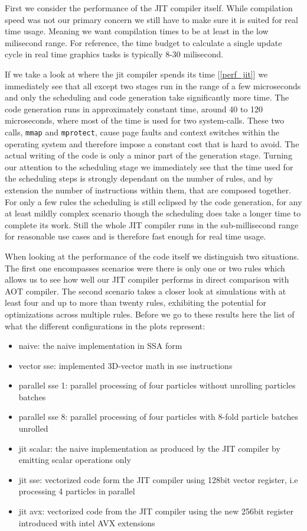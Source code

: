 First we consider the performance of the JIT compiler itself. While compilation speed was not our primary concern we still have to make sure it is suited for real time usage. Meaning we want compilation times to be at least in the low milisecond range. For reference, the time budget to calculate a single update cycle in real time graphics tasks is typically 8-30 milisecond.

If we take a look at where the jit compiler spends its time [\ref{perf_jit}] we immediately see that all except two stages run in the range of a few microseconds and only the scheduling and code generation take significantly more time. The code generation runs in approximately constant time, around 40 to 120 microseconds, where most of the time is used for two system-calls. These two calls, \texttt{mmap} and \texttt{mprotect}, cause page faults and context switches within the operating system and therefore impose a constant cost that is hard to avoid. The actual writing of the code is only a minor part of the generation stage. Turning our attention to the scheduling stage we immediately see that the time used for the scheduling steps is strongly dependant on the number of rules, and by extension the number of instructions within them, that are composed together. For only a few rules the scheduling is still eclipsed by the code generation, for any at least mildly complex scenario though the scheduling does take a longer time to complete its work. Still the whole JIT compiler runs in the sub-millisecond range for reasonable use cases and is therefore fast enough for real time usage.


When looking at the performance of the code itself we distinguish two situations. The first one encompasses scenarios were there is only one or two rules which allows us to see how well our JIT compiler performs in direct comparison with AOT compiler. The second scenario takes a closer look at simulations with at least four and up to more than twenty rules, exhibiting the potential for optimizations across multiple rules. Before we go to these results here the list of what the different configurations in the plots represent:
\begin{itemize}
\item naive: the naive implementation in SSA form
\item vector sse: implemented 3D-vector math in sse instructions
\item parallel sse 1: parallel processing of four particles without unrolling particles batches
\item parallel sse 8: parallel processing of four particles with 8-fold particle batches unrolled
\item jit scalar: the naive implementation as produced by the JIT compiler by emitting scalar operations only
\item jit sse: vectorized code form the JIT compiler using 128bit vector register, i.e processing 4 particles in parallel
\item jit avx: vectorized code from the JIT compiler using the new 256bit register introduced with intel AVX extensions
\end{itemize}


